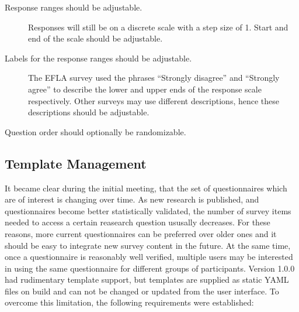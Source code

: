 \documentclass[a4paper,11pt]{article}
\begin{document}
            \begin{description}
                \item[Response ranges should be adjustable.] Responses will still be on
                a discrete scale with a step size of 1. Start and end of the scale should
                be adjustable.
                \item[Labels for the response ranges should be adjustable.] The EFLA survey
                used the phrases ``Strongly disagree'' and ``Strongly agree'' to describe
                the lower and upper ends of the response scale respectively. Other surveys
                may use different descriptions, hence these descriptions should be adjustable.
                \item[Question order should optionally be randomizable.]
            \end{description}

        \subsection{Template Management}
            It became clear during the initial meeting, that the set of 
            questionnaires which are of interest is changing over time. As new research is published,
            and questionnaires become better statistically validated, the number of survey
            items needed to access a certain reasearch question ususally decreases.
            For these reasons, more current questionnaires can be preferred over
            older ones and it should be easy to integrate new survey content in the future.
            At the same time, once a questionnaire is reasonably well verified, multiple users
            may be interested in using the same questionnaire for different groups of participants.
            Version 1.0.0 had rudimentary template support, but templates are supplied as static
            YAML files on build and can not be changed or updated from the user interface.
            To overcome this limitation, the following requirements were established:
\end{document}
